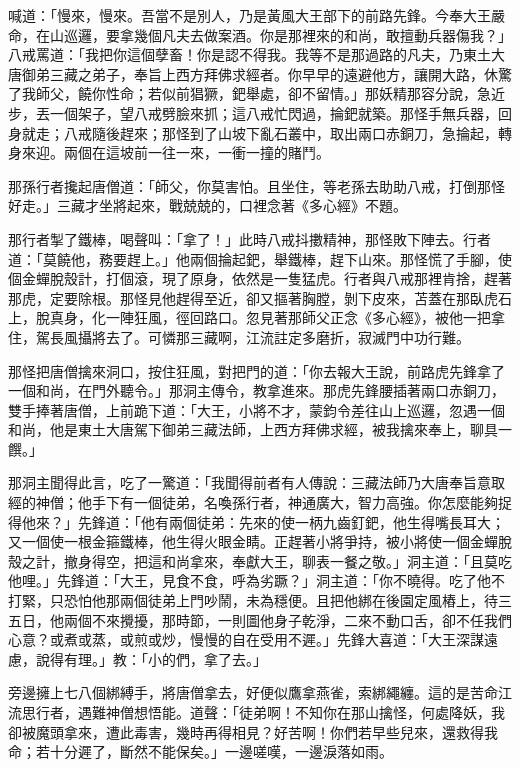 喊道：「慢來，慢來。吾當不是別人，乃是黃風大王部下的前路先鋒。今奉大王嚴命，在山巡邏，要拿幾個凡夫去做案酒。你是那裡來的和尚，敢擅動兵器傷我？」八戒罵道：「我把你這個孽畜！你是認不得我。我等不是那過路的凡夫，乃東土大唐御弟三藏之弟子，奉旨上西方拜佛求經者。你早早的遠避他方，讓開大路，休驚了我師父，饒你性命；若似前猖獗，鈀舉處，卻不留情。」那妖精那容分說，急近步，丟一個架子，望八戒劈臉來抓；這八戒忙閃過，掄鈀就築。那怪手無兵器，回身就走；八戒隨後趕來；那怪到了山坡下亂石叢中，取出兩口赤銅刀，急掄起，轉身來迎。兩個在這坡前一往一來，一衝一撞的賭鬥。

那孫行者攙起唐僧道：「師父，你莫害怕。且坐住，等老孫去助助八戒，打倒那怪好走。」三藏才坐將起來，戰兢兢的，口裡念著《多心經》不題。

那行者掣了鐵棒，喝聲叫：「拿了！」此時八戒抖擻精神，那怪敗下陣去。行者道：「莫饒他，務要趕上。」他兩個掄起鈀，舉鐵棒，趕下山來。那怪慌了手腳，使個金蟬脫殼計，打個滾，現了原身，依然是一隻猛虎。行者與八戒那裡肯捨，趕著那虎，定要除根。那怪見他趕得至近，卻又摳著胸膛，剝下皮來，苫蓋在那臥虎石上，脫真身，化一陣狂風，徑回路口。忽見著那師父正念《多心經》，被他一把拿住，駕長風攝將去了。可憐那三藏啊，江流註定多磨折，寂滅門中功行難。

那怪把唐僧擒來洞口，按住狂風，對把門的道：「你去報大王說，前路虎先鋒拿了一個和尚，在門外聽令。」那洞主傳令，教拿進來。那虎先鋒腰插著兩口赤銅刀，雙手捧著唐僧，上前跪下道：「大王，小將不才，蒙鈞令差往山上巡邏，忽遇一個和尚，他是東土大唐駕下御弟三藏法師，上西方拜佛求經，被我擒來奉上，聊具一饌。」

那洞主聞得此言，吃了一驚道：「我聞得前者有人傳說：三藏法師乃大唐奉旨意取經的神僧；他手下有一個徒弟，名喚孫行者，神通廣大，智力高強。你怎麼能夠捉得他來？」先鋒道：「他有兩個徒弟：先來的使一柄九齒釘鈀，他生得嘴長耳大；又一個使一根金箍鐵棒，他生得火眼金睛。正趕著小將爭持，被小將使一個金蟬脫殼之計，撤身得空，把這和尚拿來，奉獻大王，聊表一餐之敬。」洞主道：「且莫吃他哩。」先鋒道：「大王，見食不食，呼為劣蹶？」洞主道：「你不曉得。吃了他不打緊，只恐怕他那兩個徒弟上門吵鬧，未為穩便。且把他綁在後園定風樁上，待三五日，他兩個不來攪擾，那時節，一則圖他身子乾淨，二來不動口舌，卻不任我們心意？或煮或蒸，或煎或炒，慢慢的自在受用不遲。」先鋒大喜道：「大王深謀遠慮，說得有理。」教：「小的們，拿了去。」

旁邊擁上七八個綁縛手，將唐僧拿去，好便似鷹拿燕雀，索綁繩纏。這的是苦命江流思行者，遇難神僧想悟能。道聲：「徒弟啊！不知你在那山擒怪，何處降妖，我卻被魔頭拿來，遭此毒害，幾時再得相見？好苦啊！你們若早些兒來，還救得我命；若十分遲了，斷然不能保矣。」一邊嗟嘆，一邊淚落如雨。

